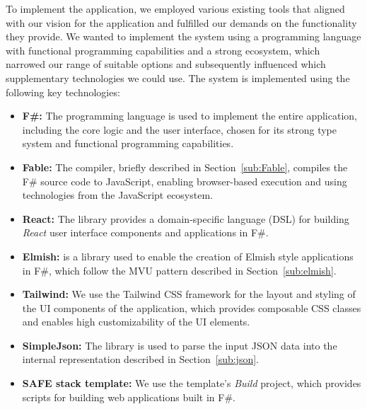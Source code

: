 To implement the application, we employed various existing tools that aligned with our vision for the application and fulfilled our demands on the functionality they provide.
We wanted to implement the system using a programming language with functional programming capabilities and a strong ecosystem, which narrowed our range of suitable options and subsequently influenced which supplementary technologies we could use.
The system is implemented using the following key technologies:
\begin{itemize}
	\item \textbf{F\#:} The \citet{fsharp} programming language is used to implement the entire application, including the core logic and the user interface, chosen for its strong type system and functional programming capabilities.
	\item \textbf{Fable:} The \citet{fable} compiler, briefly described in Section~\ref{sub:Fable}, compiles the F\# source code to JavaScript, enabling browser-based execution and using technologies from the JavaScript ecosystem.
	\item \textbf{React:} The \citet{feliz} library provides a domain-specific language (DSL) for building \emph{React} user interface components and applications in F\#.
	\item \textbf{Elmish:} \citet{elmish} is a library used to enable the creation of Elmish style applications in F\#, which follow the MVU pattern described in Section~\ref{sub:elmish}.
	\item \textbf{Tailwind:} We use the Tailwind CSS framework for the layout and styling of the UI components of the application, which provides composable CSS classes and enables high customizability of the UI elements.
	\item \textbf{SimpleJson:} The \citet{simpleJson} library is used to parse the input JSON data into the internal representation described in Section~\ref{sub:json}.
	\item \textbf{SAFE stack template:} We use the \citet{safestack} template's \emph{Build} project, which provides scripts for building web applications built in F\#.
\end{itemize}


